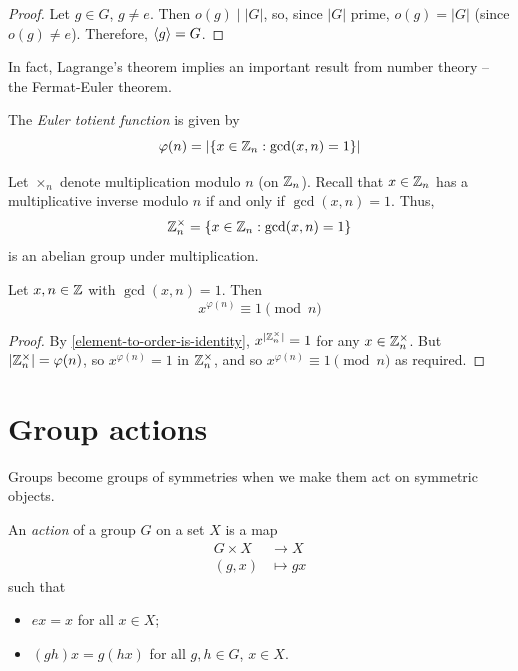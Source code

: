 \documentclass{../../template/note}
\begin{document}
    \begin{proof}
        Let \(g \in G\), \(g \neq e\). Then \(o(g) \mid |G|\), so, since \(|G|\) prime, \(o(g) = |G|\) (since \(o(g) \neq e\)). Therefore, \(\left \langle g \right \rangle = G\).
    \end{proof}
    
    In fact, Lagrange's theorem implies an important result from number theory -- the Fermat-Euler theorem.

    \begin{definition}
        The \emph{Euler totient function} is given by
        \[
            \varphi(n) = |\{x \in \mathbb Z_n : \gcd(x,n)=1\}|
        \]
    \end{definition}
    

    Let \(\times_n\) denote multiplication modulo \(n\) (on \(\mathbb Z_n\)). Recall that \(x \in \mathbb Z_n\) has a multiplicative inverse modulo \(n\) if and only if \(\gcd(x, n) = 1\). Thus,
    \[
        \mathbb Z_n^\times = \{x \in \mathbb Z_n : \gcd(x, n) = 1\}
    \]
    is an abelian group under multiplication.

    \begin{theorem}
        Let \(x, n \in \mathbb Z\) with \(\gcd(x, n) = 1\). Then
        \[
            x^{\varphi(n)} \equiv 1 \pmod n
        \]
    \end{theorem}
    
    \begin{proof}
        By \cref{element-to-order-is-identity}, \(x^{|\mathbb Z_n^\times|} = 1\) for any \(x \in \mathbb Z_n^\times\). But \(|\mathbb Z_n^\times| = \varphi(n)\), so \(x^{\varphi(n)} = 1\) in \(\mathbb Z_n^\times\), and so \(x^{\varphi(n)} \equiv 1 \pmod n\) as required.
    \end{proof}
    
    \section{Group actions}

    Groups become groups of symmetries when we make them act on symmetric objects.

    \begin{definition}
        An \emph{action} of a group \(G\) on a set \(X\) is a map
        \begin{align*}
            G \times X &\to X \\
            (g, x) &\mapsto gx
        \end{align*}
        such that
        \begin{itemize}
            \item \(ex = x\) for all \(x \in X\);
            \item \((gh)x = g(hx)\) for all \(g, h \in G\), \(x \in X\).
        \end{itemize}        
    \end{definition}
\end{document}
